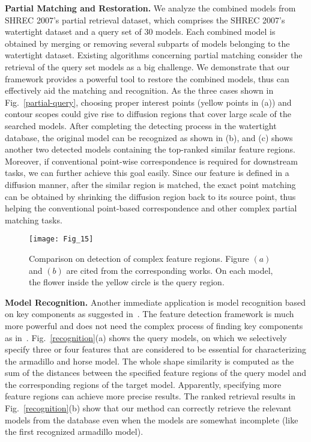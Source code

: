 \textbf{Partial Matching and Restoration.} We analyze the combined
models from SHREC 2007's partial retrieval dataset, which comprises
the SHREC 2007's watertight dataset and a query set of 30 models.
Each combined model is obtained by merging or removing several
subparts of models belonging to the watertight dataset. Existing
algorithms concerning partial matching consider the retrieval of the
query set models as a big challenge.  We demonstrate that our
framework provides a powerful tool to restore the combined models,
thus can effectively aid the matching and recognition. As the three
cases shown in Fig.~\ref{partial-query}, choosing proper interest
points (yellow points in (a)) and contour scopes could give rise to
diffusion regions that cover large scale of the searched models.
After completing the detecting process in the watertight database,
the original model can be recognized as shown in (b), and (c) shows
another two detected models containing the top-ranked similar feature
regions. Moreover, if conventional point-wise correspondence is
required for downstream tasks, we can further achieve this goal
easily. Since our feature is defined in a diffusion manner, after the
similar region is matched, the exact point matching can be obtained
by shrinking the diffusion region back to its source point, thus
helping the conventional point-based correspondence and other complex
partial matching tasks.

\begin{figure}[!to]
\texttt{[image: Fig\_15]}
\caption[Comparisons of detecting complex feature regions.]
  {Comparison on detection of complex feature regions. Figure
  $(a)$ and $(b)$ are cited from the corresponding works. On each
  model, the flower inside the yellow circle is the query region.}
\label{Gal}
\end{figure}

\textbf{Model Recognition.} Another immediate application is model
recognition based on key components as suggested
in~\cite{Sipiran:2012}. The feature detection framework is much more
powerful and does not need the complex process of finding key
components as in~\cite{Sipiran:2012}.  Fig.~\ref{recognition}(a) shows
the query models, on which we selectively specify three or four
features that are considered to be essential for characterizing the
armadillo and horse model. The whole shape similarity is computed as
the sum of the distances between the specified feature regions of the
query model and the corresponding regions of the target model.
Apparently, specifying more feature regions can achieve more precise
results. The ranked retrieval results in Fig.~\ref{recognition}(b)
show that our method can correctly retrieve the relevant models from
the database even when the models are somewhat incomplete (like the
first recognized armadillo model).

